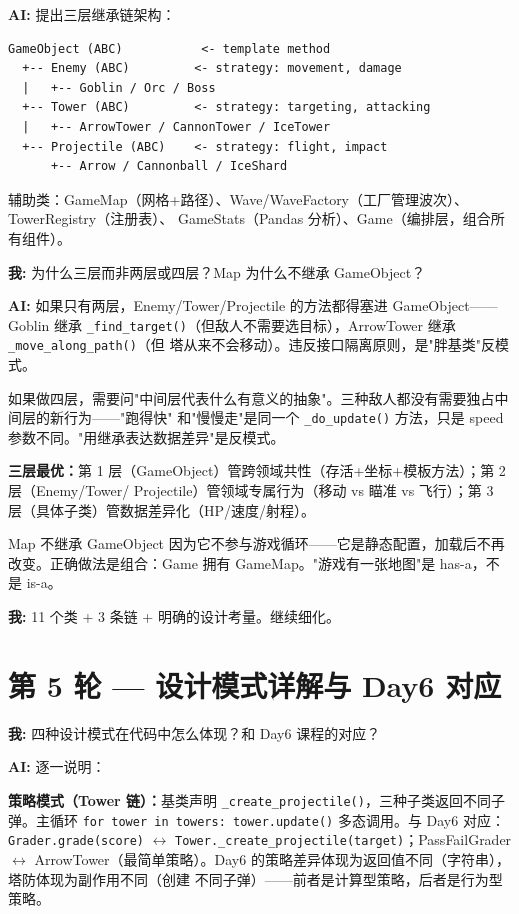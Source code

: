 \documentclass[12pt,a4paper]{ctexart}
\begin{document}
\textbf{AI:} 提出三层继承链架构：

\begin{verbatim}
GameObject (ABC)           <- template method
  +-- Enemy (ABC)         <- strategy: movement, damage
  |   +-- Goblin / Orc / Boss
  +-- Tower (ABC)         <- strategy: targeting, attacking
  |   +-- ArrowTower / CannonTower / IceTower
  +-- Projectile (ABC)    <- strategy: flight, impact
      +-- Arrow / Cannonball / IceShard
\end{verbatim}

辅助类：GameMap（网格+路径）、Wave/WaveFactory（工厂管理波次）、TowerRegistry（注册表）、
GameStats（Pandas 分析）、Game（编排层，组合所有组件）。

\textbf{我:} 为什么三层而非两层或四层？Map 为什么不继承 GameObject？

\textbf{AI:} 如果只有两层，Enemy/Tower/Projectile 的方法都得塞进 GameObject——Goblin 继承
\texttt{\_find\_target()}（但敌人不需要选目标），ArrowTower 继承 \texttt{\_move\_along\_path()}（但
塔从来不会移动）。违反接口隔离原则，是"胖基类"反模式。

如果做四层，需要问"中间层代表什么有意义的抽象"。三种敌人都没有需要独占中间层的新行为——"跑得快"
和"慢慢走"是同一个 \texttt{\_do\_update()} 方法，只是 speed 参数不同。"用继承表达数据差异"是反模式。

\textbf{三层最优：}第 1 层（GameObject）管跨领域共性（存活+坐标+模板方法）；第 2 层（Enemy/Tower/
Projectile）管领域专属行为（移动 vs 瞄准 vs 飞行）；第 3 层（具体子类）管数据差异化（HP/速度/射程）。

Map 不继承 GameObject 因为它不参与游戏循环——它是静态配置，加载后不再改变。正确做法是组合：Game
拥有 GameMap。"游戏有一张地图"是 has-a，不是 is-a。

\textbf{我:} 11 个类 + 3 条链 + 明确的设计考量。继续细化。

\section*{第 5 轮 — 设计模式详解与 Day6 对应}

\textbf{我:} 四种设计模式在代码中怎么体现？和 Day6 课程的对应？

\textbf{AI:} 逐一说明：

\textbf{策略模式（Tower 链）：}基类声明 \texttt{\_create\_projectile()}，三种子类返回不同子弹。主循环
\texttt{for tower in towers: tower.update()} 多态调用。与 Day6 对应：\texttt{Grader.grade(score)}
$\leftrightarrow$ \texttt{Tower.\_create\_projectile(target)}；PassFailGrader $\leftrightarrow$
ArrowTower（最简单策略）。Day6 的策略差异体现为返回值不同（字符串），塔防体现为副作用不同（创建
不同子弹）——前者是计算型策略，后者是行为型策略。
\end{document}
